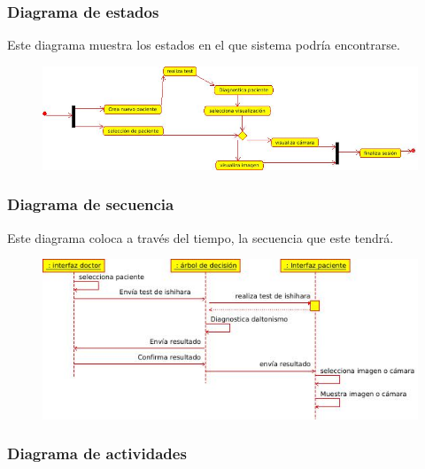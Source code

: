 \documentclass[10pt]{article}
\begin{document}
\subsubsection{Diagrama de estados}

Este diagrama muestra los estados en el que sistema podría encontrarse.

\begin{figure}[H]
	\begin{center}
\includegraphics[scale = 0.80]{UML/estados.jpeg}
	\end{center} 
\end{figure}
\subsubsection{Diagrama de secuencia}

Este diagrama coloca a través del tiempo, la secuencia que este tendrá.

\begin{figure}[H]
	\begin{center}
\includegraphics[scale = 1.10]{UML/secuencia.jpeg}
	\end{center} 
\end{figure}

\newpage

\subsubsection{Diagrama de actividades}
\end{document}
